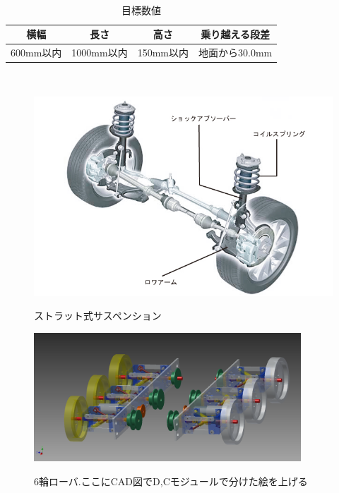 \documentclass[a4paper]{jarticle}
\begin{document}
\begin{table}[htb]
 　\begin{center}
    \caption{目標数値}
  \begin{tabular}{|c|c|c||c|} \hline
    横幅 & 長さ & 高さ & 乗り越える段差 \\ \hline \hline
    600mm以内 & 1000mm以内 & 150mm以内 & 地面から30.0mm \\ \hline
  \end{tabular}
　   \label{tab:joken}
  \end{center}
\end{table}




\begin{figure}[htbt]
 \begin{center}
  \includegraphics[width=120mm]{img/strat.jpg}
 　\caption{ストラット式サスペンション}
  \label{fig:strat}%
 \end{center}
\end{figure}

\begin{figure}[htbt]
 \begin{center}
  \includegraphics[width=100mm]{img/int.png}
 　\caption{6輪ローバ.ここにCAD図でD,Cモジュールで分けた絵を上げる}
  \label{fig:rokurin}%
 \end{center}
\end{figure}
\end{document}

